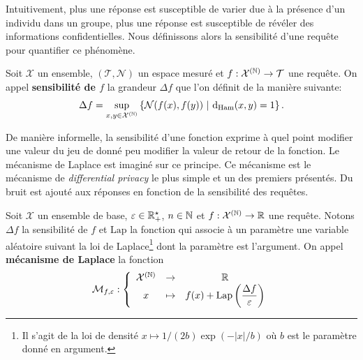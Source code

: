 Intuitivement, plus une réponse est susceptible de varier due à la présence d'un individu dans un groupe, plus une réponse est susceptible de révéler des informations confidentielles. Nous définissons alors la sensibilité d'une requête pour quantifier ce phénomène.

\begin{definition}
    Soit \(\mathcal X\) un ensemble, \((\mathcal T, \mathcal N)\) un espace mesuré et \(f : \mathcal X^{(\mathbb{N})} \to \mathcal T\) une requête. On appel \textbf{sensibilité de \(f\)} la grandeur \(\Delta f\) que l'on définit de la manière suivante:
    \[
        \Delta f = \underset{x, y \in \mathcal X^{(\N)}}{\sup} \left\{ \mathcal N(f(x), f(y)) \ | \ \dt_{\text{Ham}}(x,y) = 1 \right\}. 
    \]
\end{definition}

De manière informelle, la sensibilité d'une fonction exprime à quel point modifier une valeur du jeu de donné peu modifier la valeur de retour de la fonction. Le mécanisme de {\sc Laplace} \cite{dwork2014the} est imaginé sur ce principe. Ce mécanisme est le mécanisme de \textit{differential privacy} le plus simple et un des premiers présentés. Du bruit est ajouté aux réponses en fonction de la sensibilité des requêtes.

\begin{definition}
    Soit \(\mathcal X\) un ensemble de base, \(\varepsilon \in \mathbb{R}_+^\star\), \(n \in \mathbb{N}\) et \(f : \mathcal X^{(\mathbb{N})} \to \mathbb{R}\) une requête. Notons \(\Delta f\) la sensibilité de \(f\) et \(\text{Lap}\) la fonction qui associe à un paramètre une variable aléatoire suivant la loi de {\sc Laplace}\footnote{Il s'agit de la loi de densité \(x \mapsto 1/(2b) \exp(-|x|/b)\) où \(b\) est le paramètre donné en argument.} dont la paramètre est l'argument. On appel \textbf{mécanisme de {\sc Laplace}} la fonction 
    \[
        \mathcal M_{f,\varepsilon} : \left\{ 
            \begin{array}{ccc}
                \mathcal X^{(\mathbb{N})} & \to & \mathbb{R}\\
                x & \mapsto & f(x) + \text{Lap}\left( \dfrac{\Delta f}{\varepsilon} \right)
            \end{array}
        \right.    
    \]
\end{definition}

